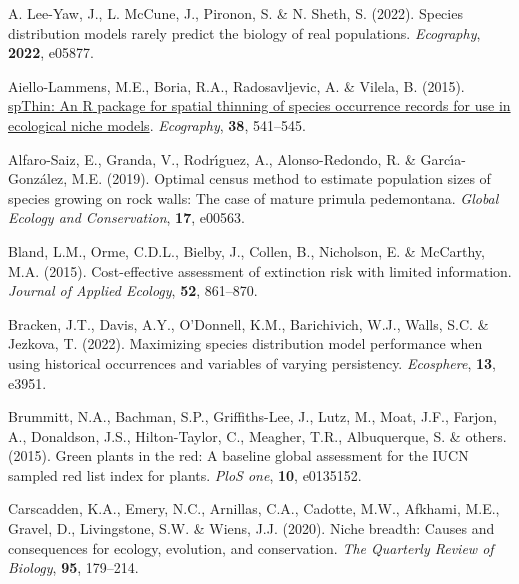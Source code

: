 \documentclass[
]{article}
\newlength{\cslhangindent}
\newlength{\cslentryspacingunit} %
\newenvironment{CSLReferences}[2] %
 {%
  \setlength{\parindent}{0pt}
  \ifodd #1
  \let\oldpar\par
  \def\par{\hangindent=\cslhangindent\oldpar}
  \fi
  \setlength{\parskip}{#2\cslentryspacingunit}
 }%
 {}
\begin{document}
\hypertarget{refs}{}
\begin{CSLReferences}{1}{0}
\leavevmode{}%
A. Lee-Yaw, J., L. McCune, J., Pironon, S. \& N. Sheth, S. (2022).
Species distribution models rarely predict the biology of real
populations. \emph{Ecography}, \textbf{2022}, e05877.

\leavevmode{}%
Aiello-Lammens, M.E., Boria, R.A., Radosavljevic, A. \& Vilela, B.
(2015).
\href{https://onlinelibrary.wiley.com/doi/10.1111/ecog.01132}{{spThin}:
An {R} package for spatial thinning of species occurrence records for
use in ecological niche models}. \emph{Ecography}, \textbf{38},
541--545.

\leavevmode{}%
Alfaro-Saiz, E., Granda, V., Rodrı́guez, A., Alonso-Redondo, R. \&
Garcı́a-González, M.E. (2019). Optimal census method to estimate
population sizes of species growing on rock walls: The case of mature
primula pedemontana. \emph{Global Ecology and Conservation},
\textbf{17}, e00563.

\leavevmode{}%
Bland, L.M., Orme, C.D.L., Bielby, J., Collen, B., Nicholson, E. \&
McCarthy, M.A. (2015). Cost-effective assessment of extinction risk with
limited information. \emph{Journal of Applied Ecology}, \textbf{52},
861--870.

\leavevmode{}%
Bracken, J.T., Davis, A.Y., O'Donnell, K.M., Barichivich, W.J., Walls,
S.C. \& Jezkova, T. (2022). Maximizing species distribution model
performance when using historical occurrences and variables of varying
persistency. \emph{Ecosphere}, \textbf{13}, e3951.

\leavevmode{}%
Brummitt, N.A., Bachman, S.P., Griffiths-Lee, J., Lutz, M., Moat, J.F.,
Farjon, A., Donaldson, J.S., Hilton-Taylor, C., Meagher, T.R.,
Albuquerque, S. \& others. (2015). Green plants in the red: A baseline
global assessment for the IUCN sampled red list index for plants.
\emph{PloS one}, \textbf{10}, e0135152.

\leavevmode{}%
Carscadden, K.A., Emery, N.C., Arnillas, C.A., Cadotte, M.W., Afkhami,
M.E., Gravel, D., Livingstone, S.W. \& Wiens, J.J. (2020). Niche
breadth: Causes and consequences for ecology, evolution, and
conservation. \emph{The Quarterly Review of Biology}, \textbf{95},
179--214.


\end{CSLReferences}
\end{document}
